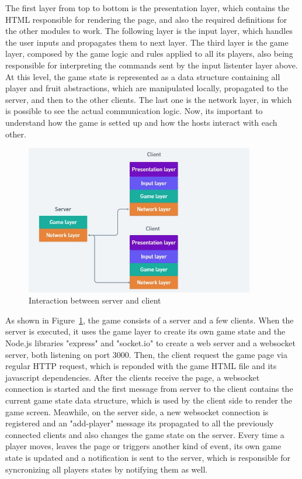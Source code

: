 \documentclass[english]{sbrt}
\begin{document}
The first layer from top to bottom is the presentation layer, which contains the HTML responsible for rendering the page, and also the required definitions for the other modules to work.
The following layer is the input layer, which handles the user inputs and propagates them to next layer. The third layer is the game layer, composed by the game logic and rules
applied to all its players, also being responsible for interpreting the commands sent by the input listenter layer above. At this level, the game state is represented as a data structure containing
all player and fruit abstractions, which are manipulated locally, propagated to the server, and then to the other clients. The last one is the network layer, in which is possible to see the actual communication logic.
Now, its important to understand how the game is setted up and how the hosts interact with each other.

\begin{figure}[H]
  \centering
  \includegraphics[width=10cm]{game-diagram.jpg}
  \caption{Interaction between server and client}
  \label{game-diagram}
\end{figure}

As shown in Figure~\ref{game-diagram}, the game consists of a server and a few clients. When the server is executed, it uses the game layer to create its own game state and the Node.js libraries "express" and "socket.io" to create a web server and a websocket server, both listening on port 3000.
Then, the client request the game page via regular HTTP request, which is reponded with the game HTML file and its javascript dependencies. After the clients receive the page, a websocket connection is started and the first message from server to the client contains the current
game state data structure, which is used by the client side to render the game screen. Meawhile, on the server side, a new websocket connection is registered and an "add-player" message its propagated to all the previously connected clients and also changes the game state on the server.
Every time a player moves, leaves the page or triggers another kind of event, its own game state is updated and a notification is sent to the server, which is responsible for syncronizing all players states by notifying them as well.
\end{document}

